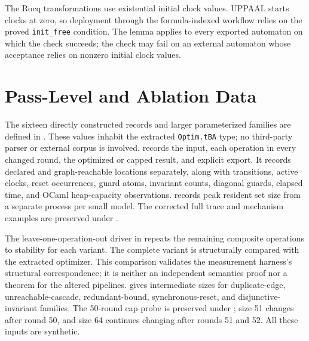 \documentclass{ieeeaccess}
\begin{document}
The Rocq transformations use existential initial clock values. UPPAAL starts clocks at zero, so deployment through the formula-indexed workflow relies on the proved \texttt{init\_free} condition. The lemma  applies to every exported automaton on which the check succeeds; the check may fail on an external automaton whose acceptance relies on nonzero initial clock values.

\section{Pass-Level and Ablation Data}
The sixteen directly constructed records and larger parameterized families are defined in . These values inhabit the extracted \texttt{Optim.tBA} type; no third-party parser or external corpus is involved.  records the input, each operation in every changed round, the optimized or capped result, and explicit export. It records declared and graph-reachable locations separately, along with transitions, active clocks, reset occurrences, guard atoms, invariant counts, diagonal guards, elapsed time, and OCaml heap-capacity observations.  records peak resident set size from a separate process per small model. The corrected full trace and mechanism examples are preserved under .

The leave-one-operation-out driver in  repeats the remaining composite operations to stability for each variant. The complete variant is structurally compared with the extracted optimizer. This comparison validates the measurement harness's structural correspondence; it is neither an independent semantics proof nor a theorem for the altered pipelines.  gives intermediate sizes for duplicate-edge, unreachable-cascade, redundant-bound, synchronous-reset, and disjunctive-invariant families. The 50-round cap probe is preserved under ; size 51 changes after round 50, and size 64 continues changing after rounds 51 and 52. All these inputs are synthetic.
\end{document}

